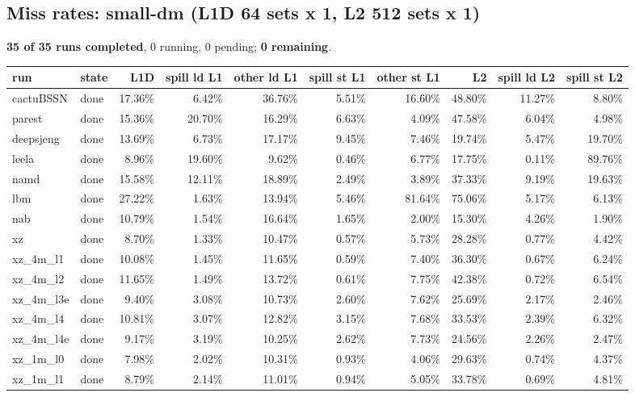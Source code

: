 \documentclass[10pt,a4paper,landscape]{article}
\begin{document}
\subsection*{Miss rates: small-dm (L1D 64 sets x 1, L2 512 sets x 1)}
\textbf{35 of 35 runs completed}, 0 running, 0 pending; \textbf{0 remaining}.\par
{\footnotesize
\begin{longtable}{llrrrrrrrr}
\toprule
run & state & L1D & spill ld L1 & other ld L1 & spill st L1 & other st L1 & L2 & spill ld L2 & spill st L2 \\
\midrule
\endhead
\bottomrule
\endfoot
cactuBSSN & done & 17.36\% & 6.42\% & 36.76\% & 5.51\% & 16.60\% & 48.80\% & 11.27\% & 8.80\% \\
parest & done & 15.36\% & 20.70\% & 16.29\% & 6.63\% & 4.09\% & 47.58\% & 6.04\% & 4.98\% \\
deepsjeng & done & 13.69\% & 6.73\% & 17.17\% & 9.45\% & 7.46\% & 19.74\% & 5.47\% & 19.70\% \\
leela & done & 8.96\% & 19.60\% & 9.62\% & 0.46\% & 6.77\% & 17.75\% & 0.11\% & 89.76\% \\
namd & done & 15.58\% & 12.11\% & 18.89\% & 2.49\% & 3.89\% & 37.33\% & 9.19\% & 19.63\% \\
lbm & done & 27.22\% & 1.63\% & 13.94\% & 5.46\% & 81.64\% & 75.06\% & 5.17\% & 6.13\% \\
nab & done & 10.79\% & 1.54\% & 16.64\% & 1.65\% & 2.00\% & 15.30\% & 4.26\% & 1.90\% \\
xz & done & 8.70\% & 1.33\% & 10.47\% & 0.57\% & 5.73\% & 28.28\% & 0.77\% & 4.42\% \\
xz\_4m\_l1 & done & 10.08\% & 1.45\% & 11.65\% & 0.59\% & 7.40\% & 36.30\% & 0.67\% & 6.24\% \\
xz\_4m\_l2 & done & 11.65\% & 1.49\% & 13.72\% & 0.61\% & 7.75\% & 42.38\% & 0.72\% & 6.54\% \\
xz\_4m\_l3e & done & 9.40\% & 3.08\% & 10.73\% & 2.60\% & 7.62\% & 25.69\% & 2.17\% & 2.46\% \\
xz\_4m\_l4 & done & 10.81\% & 3.07\% & 12.82\% & 3.15\% & 7.68\% & 33.53\% & 2.39\% & 6.32\% \\
xz\_4m\_l4e & done & 9.17\% & 3.19\% & 10.25\% & 2.62\% & 7.73\% & 24.56\% & 2.26\% & 2.47\% \\
xz\_1m\_l0 & done & 7.98\% & 2.02\% & 10.31\% & 0.93\% & 4.06\% & 29.63\% & 0.74\% & 4.37\% \\
xz\_1m\_l1 & done & 8.79\% & 2.14\% & 11.01\% & 0.94\% & 5.05\% & 33.78\% & 0.69\% & 4.81\% \\

\end{longtable}}
\end{document}
